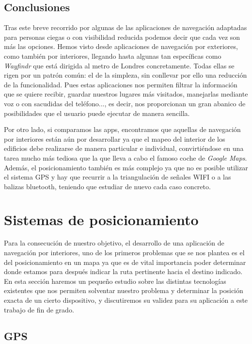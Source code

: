 \subsection{Conclusiones}
Tras este breve recorrido por algunas de las aplicaciones de navegación adaptadas para personas ciegas o con visibilidad reducida podemos decir que cada vez son más las opciones. Hemos visto desde aplicaciones de navegación por exteriores, como también por interiores, llegando hasta algunas tan específicas como \textit{Wayfindr} que está dirigida al metro de Londres concretamente. Todas ellas se rigen por un patrón común: el de la simpleza, sin conllevar por ello una reducción de la funcionalidad. Pues estas aplicaciones nos permiten filtrar la información que se quiere recibir, guardar nuestros lugares más visitados, manejarlas mediante voz o con sacudidas del teléfono..., es decir, nos proporcionan un gran abanico de posibilidades que el usuario puede ejecutar de manera sencilla.

Por otro lado, si comparamos las apps, encontramos que aquellas de navegación por interiores están aún por desarrollar ya que el mapeo del interior de los edificios debe realizarse de manera particular e individual, convirtiéndose en una tarea mucho más tediosa que la que lleva a cabo el famoso coche de \textit{Google Maps}. Además, el posicionamiento también es más complejo ya que no es posible utilizar el sistema GPS y hay que recurrir a la triangulación de señales WIFI o a las balizas bluetooth, teniendo que estudiar de nuevo cada caso concreto.


\section{Sistemas de posicionamiento}
Para la consecución de nuestro objetivo, el desarrollo de una aplicación de navegación por interiores, uno de los primeros problemas que se nos plantea es el del posicionamiento en un mapa ya que es de vital importancia poder determinar donde estamos para después indicar la ruta pertinente hacia el destino indicado. En esta sección haremos un pequeño estudio sobre las distintas tecnologías existentes que nos permiten solventar nuestro problema y determinar la posición exacta de un cierto dispositivo, y discutiremos su validez para su aplicación a este trabajo de fin de grado.

\subsection{GPS}

